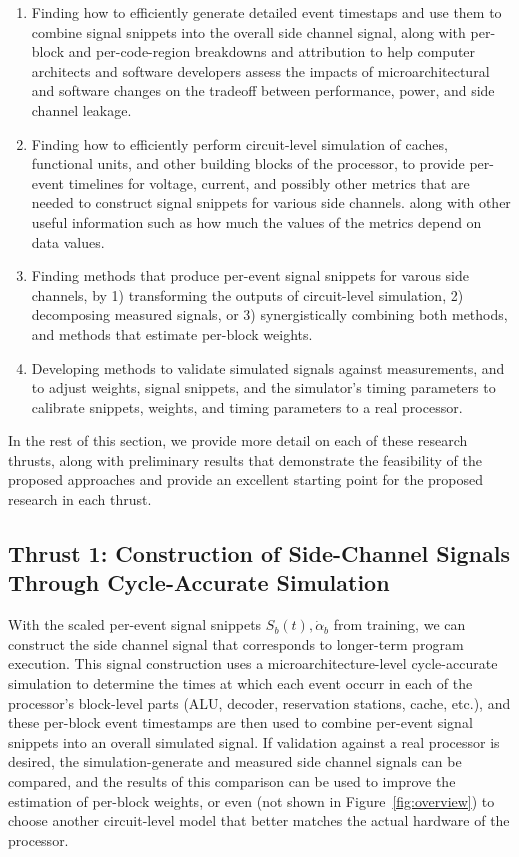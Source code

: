 \begin{enumerate}
\item Finding how to efficiently generate detailed event timestaps and use them to combine signal snippets into the overall side channel signal, along with per-block and per-code-region breakdowns and attribution to help computer architects and software developers assess the impacts of microarchitectural and software changes on the tradeoff between performance, power, and side channel leakage.
\item Finding how to efficiently perform circuit-level simulation of caches, functional units, and other building blocks of the processor, to provide per-event timelines for voltage, current, and possibly other metrics that are needed to construct signal snippets for various side channels. along with other useful information such as how much the values of the metrics depend on data values.
\item Finding methods that produce per-event signal snippets for varous side channels, by 1) transforming the outputs of circuit-level simulation, 2) decomposing measured signals, or 3) synergistically combining both methods, and methods that estimate per-block weights.
\item Developing methods to validate simulated signals against measurements, and to adjust weights, signal snippets, and the simulator's timing parameters to calibrate snippets, weights, and timing parameters to a real processor.
\end{enumerate}

In the rest of this section, we provide more detail on each of these research thrusts, along with preliminary results that demonstrate the feasibility of the proposed approaches and provide an excellent starting point for the proposed research in each thrust.

\subsection{Thrust 1: Construction of Side-Channel Signals Through Cycle-Accurate Simulation}

With the scaled per-event signal snippets $S_b(t) , \dot \alpha_b$ from training, we can construct the side channel signal that corresponds to longer-term program execution. This signal construction uses a microarchitecture-level cycle-accurate simulation to determine the times at which each event occurr in each of the processor's block-level parts (ALU, decoder, reservation stations, cache, etc.), and these per-block event timestamps are then used to combine per-event signal snippets into an overall simulated signal. If validation against a real processor is desired, the simulation-generate and measured side channel signals can be compared, and the results of this comparison can be used to improve the estimation of per-block weights, or even (not shown in Figure~\ref{fig:overview})  to choose another circuit-level model that better matches the actual hardware of the processor.

